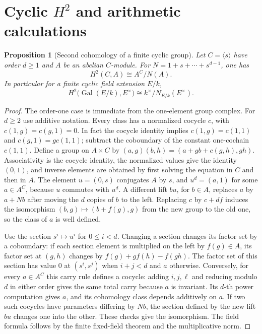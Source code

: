 \documentclass[11pt,oneside,openany]{book}
\newtheorem{proposition}[theorem]{Proposition}
\theoremstyle{definition}
\theoremstyle{remark}
\begin{document}
\section{Cyclic \texorpdfstring{\(H^2\)}{H2} and arithmetic calculations}

\begin{proposition}[Second cohomology of a finite cyclic group]
\label{res:GH11}
Let \(C=\langle s\rangle\) have order \(d\geq1\) and \(A\) be an
abelian \(C\)-module. For \(N=1+s+\cdots+s^{d-1}\), one has
\[
 H^2(C,A)\cong A^C/N(A).
\]
In particular for a finite cyclic field extension \(E/k\),
\[
 H^2\bigl(\operatorname{Gal}(E/k),E^\times\bigr)
     \cong k^\times/N_{E/k}(E^\times).
\]
\end{proposition}
\begin{proof}
The order-one case is immediate from the one-element group complex.
For \(d\geq2\) use additive notation. Every class has a normalized
cocycle \(c\), with \(c(1,g)=c(g,1)=0\). In fact the cocycle identity
implies \(c(1,g)=c(1,1)\) and \(c(g,1)=g c(1,1)\); subtract the
coboundary of the constant one-cochain \(c(1,1)\).
Define a group on \(A\times C\) by
\((a,g)(b,h)=(a+g b+c(g,h),gh)\).
Associativity is the cocycle identity, the normalized values give
the identity \((0,1)\), and inverse elements are obtained by first
solving the equation in \(C\) and then in \(A\).
The element \(u=(0,s)\) conjugates \(A\) by \(s\), and
\(u^d=(a,1)\) for some \(a\in A^C\), because \(u\) commutes with
\(u^d\). A different lift \(b u\), for \(b\in A\), replaces
\(a\) by \(a+N b\) after moving the \(d\) copies of \(b\) to the
left. Replacing \(c\) by \(c+df\) induces the isomorphism
\((b,g)\mapsto (b+f(g),g)\) from the new group to the old one, so the
class of \(a\) is well defined.

Use the section \(s^i\mapsto u^i\) for \(0\leq i<d\).
Changing a section changes its factor set by a coboundary:
if each section element is multiplied on the left by \(f(g)\in A\),
its factor set at \((g,h)\) changes by
\(f(g)+g f(h)-f(gh)\). The factor set of this section has value \(0\)
at \((s^i,s^j)\) when \(i+j<d\) and \(a\) otherwise.
Conversely, for every \(a\in A^C\) this carry rule defines a
cocycle: adding \(i,j,\ell\) and reducing modulo \(d\) in either
order gives the same total carry because \(a\) is invariant.
Its \(d\)-th power computation gives \(a\), and its cohomology
class depends additively on \(a\). If two such cocycles have
parameters differing by \(N b\), the section defined by the
new lift \(b u\) changes one into the other. These checks give the
isomorphism. The field formula follows by the finite fixed-field
theorem and the multiplicative norm.
\end{proof}
\end{document}
